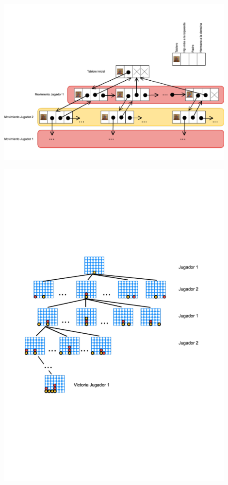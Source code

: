 \begin{DoxyImage}
\includegraphics[width=12cm]{connect4-tree}
\caption{Estructura interna de un T\+DA Árbol General para representar el espacio de soluciones de Conecta 4}
\end{DoxyImage}







\begin{DoxyImage}
\includegraphics[width=12cm]{connect4-tree-YR}
\caption{Detalle de posibles movimientos en el espacio de soluciones de Conecta 4}
\end{DoxyImage}


